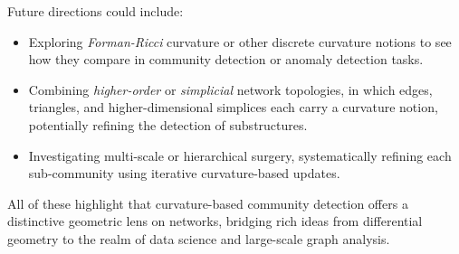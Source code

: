 
Future directions could include:
\begin{itemize}
    \item Exploring \emph{Forman-Ricci} curvature or other discrete curvature notions to see how they compare in community detection or anomaly detection tasks.
    \item Combining \emph{higher-order} or \emph{simplicial} network topologies, in which edges, triangles, and higher-dimensional simplices each carry a curvature notion, potentially refining the detection of substructures.
    \item Investigating multi-scale or hierarchical surgery, systematically refining each sub-community using iterative curvature-based updates.
\end{itemize}

All of these highlight that curvature-based community detection offers a distinctive geometric lens on networks, bridging rich ideas from differential geometry to the realm of data science and large-scale graph analysis.